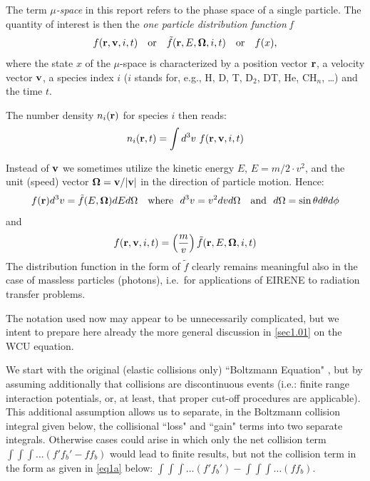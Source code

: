 The term \textsl{$\mu$-space} in this report refers to the phase space of a
single particle.
The quantity of interest is then the \textsl{one particle distribution function}  \textit{f}
\begin{displaymath}
  f(\mathbf{r}, \mathbf{v}, i, t)  \quad \mbox{or}
  \quad \tilde f(\mathbf{r}, E, \mathbf{\Omega}, i, t) \quad \mbox{or} \quad f(x),
\end{displaymath}
where the state $x$ of the $\mu$-space is characterized by a
position vector $\mathbf{r}$, a velocity vector $\mathbf{v}$, a species index $i$ ($i$ stands
for, e.g., H, D, T, D$_2$, DT, He, CH$_n$, \dots) and the time $t$.

The number density $n_i(\mathbf{r})$ for species $i$ then reads:
\begin{displaymath}
  n_i(\vr,t) = \int d^3{v} \ f(\vr,\vvv,i,t)
\end{displaymath}

Instead of $\mathbf{v}$ we sometimes utilize the kinetic energy $E$, $E=m/2 \cdot
  v^2$, and the unit (speed) vector $\mathbf{\Omega} = \mathbf{v}/|\mathbf{v}|$ in the direction of
particle motion.
Hence:
\begin{equation}
  \nonumber
  f(\mathbf{r})d^3v = \tilde f(E, \mathbf{\Omega})dEd\Omega \quad \mbox{where}  ~~d^3v = v^2dv
  d\Omega \quad \mbox{and} ~~ d\Omega = \sin \theta d\theta d\phi
\end{equation}
and
\begin{displaymath}
  f(\mathbf{r}, \mathbf{v}, i,t) = \left(\frac{m}{v}\right)
  \tilde{f}
  (\mathbf{r}, E, \mathbf{\Omega}, i, t)
\end{displaymath}
The distribution function in the form
of $\tilde f$ clearly remains meaningful also in the case of massless particles
(photons), i.e.\ for applications of EIRENE to radiation transfer problems.

The notation used now may appear to be unnecessarily complicated, but we intent
to prepare here already the more general discussion in \cref{sec1.01} on the
\ac{WCU} equation.

We start with the original (elastic collisions only) ``Boltzmann Equation"
\cite{kn:Cercignani}, but by assuming additionally that collisions are
discontinuous events (i.e.: finite range interaction potentials, or, at least,
that proper cut-off procedures are applicable).
This additional assumption allows us to separate, in the Boltzmann collision
integral given below, the collisional ``loss" and ``gain" terms into two
separate integrals.
Otherwise cases could arise in which only the net collision term
$\int\!\!\int\!\!\int \dots (f'f_b'-ff_b)$ would lead to finite results, but
not the collision term in the form as given in \cref{eq1a} below:
$\int\!\!\int\!\!\int \dots (f'f_b')- \int\!\!\int\!\!\int \dots (ff_b)$.

